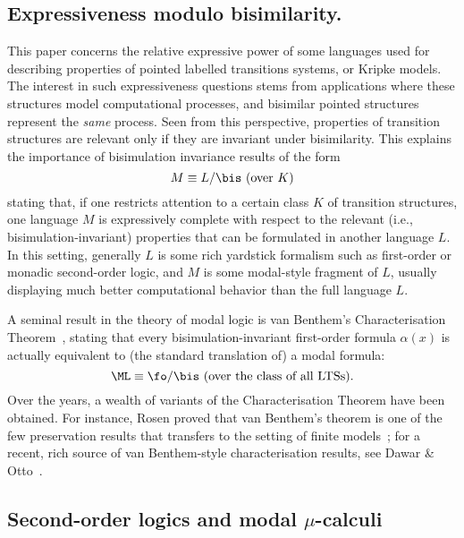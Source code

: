 
\subsection{Expressiveness modulo bisimilarity.}
%
This paper concerns the relative expressive power of some languages used for
describing properties of pointed labelled transitions systems, or Kripke
models.
The interest in such expressiveness questions stems from applications where
these structures model computational processes, and bisimilar pointed
structures represent the \emph{same} process.
Seen from this perspective, properties of transition structures are relevant
only if they are invariant under bisimilarity.
This explains the importance of bisimulation invariance results of the form
\begin{equation*}
M \equiv L / {\bis} \text{ (over $K$)}
\end{equation*}
stating that,  if one restricts attention to a certain class $K$ of transition
structures, one language $M$ is expressively complete with respect to the
relevant (i.e., bisimulation-invariant) properties that can be formulated in
another language $L$.
In this setting, generally $L$ is some rich yardstick formalism such as
first-order or monadic second-order logic, and $M$ is some modal-style
fragment of $L$, usually displaying much better computational behavior
than the full language $L$.

A seminal result in the theory of modal logic is van Benthem's Characterisation
Theorem~\cite{vanBenthemPhD}, stating that every bisimulation-invariant
first-order formula $\alpha(x)$ is actually equivalent to (the standard
translation of) a modal formula:
\begin{equation*}
\ML \equiv \fo/{\bis} \text{ (over the class of all LTSs)}.
\end{equation*}
Over the years, a wealth of variants of the Characterisation Theorem have been
obtained.
For instance, Rosen proved that van Benthem's theorem is one of the few
preservation results that transfers to the setting of finite
models~\cite{rose:moda97}; for a recent, rich source of van Benthem-style
characterisation results, see Dawar \& Otto~\cite{DawarO09}.

\subsection{Second-order logics and modal $\mu$-calculi}

